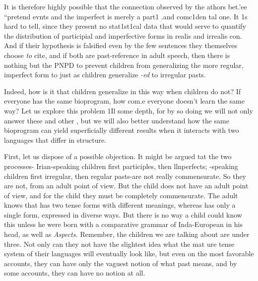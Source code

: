 
It is therefore highly possible that the connection observed by the athors bet{\textquotedbl}.'ee ``pretend evnts and the imperfect is merely a part1 .and comc1den tal one. It 1s hard to tell, since they present no stat1st1cal data that would serve to quantify the distribution of participial and imperfective forms in realis and irrealis con. And if their hypothesis is falsified even by the few sentences they themselves choose \textit{to} cite, and if both  are past-reference in adult speech, then there is nothing but the PNPD to prevent children from general\-izing the more regular, imperfect form to  just as  children generalize \textit{{}-ed} to irregular pasts. 

Indeed, how is it that  children generalize in this way when  children do not? If everyone has the same bioprogram, how com.e everyone doesn't learn the same way? Let us explore this problem 1Il some depth, for by so doing we will not only answer these and other , but we will also better understand how the same
bioprogram can yield superficially different results when it interacts with two languages that differ in structure.

First, let us dispose of a possible objection. It might be argued tat the two processes- Irian-speaking children  first parti\-ciples, then llnperfects; -speaking children  first irregular, then regular pasts{}-are not really commensurate. So they are not, from an adult point of view. But the child does not have an adult point of view, and for the child they must be completely commen\-surate. The adult knows that  has two tense forms with different meanings, whereas  has only a single form, expressed in diverse ways. But there is no way a child could know this unless he were born with a comparative grammar of Inda-European in his head, as well as \textit{Aspects. }Remember, the children we are talking about are under three. Not only can they not have the slightest idea what the mat ure tense system of their languages will eventually look like, but even on the most favorable accounts, they can have only the vaguest notion of
what past means, and by some accounts, they can have no notion at all.


